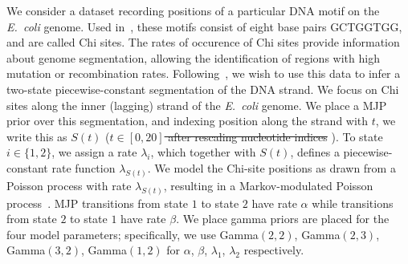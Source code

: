 
  We consider a dataset recording positions of a particular DNA motif 
  on the {\em E.\ coli} genome. Used in~\cite{FearnSher2006}, these 
  motifs consist of eight base pairs GCTGGTGG, and are called Chi sites.
  The rates of occurence of Chi sites provide information about genome 
  segmentation, allowing the identification of regions with high 
  mutation or recombination rates.
  Following~\cite{FearnSher2006}, we wish to use this data to infer a 
  two-state piecewise-constant segmentation of the DNA strand. 
  We focus on Chi sites along the inner (lagging) strand of the 
  {\em E.\ coli} genome.  We place a 
  MJP prior over this segmentation, and indexing position along the 
  strand with $t$, we write this as $S(t)$ (\sout{$t \in [0,20]$ after rescaling 
  nucleotide indices}  ). To state $i \in 
  \{1,2\}$, we assign a rate $\lambda_i$, which together with $S(t)$, 
  defines a piecewise-constant rate function $\lambda_{S(t)}$. We model 
  the Chi-site positions as drawn from a Poisson process with rate 
  $\lambda_{S(t)}$, resulting in a {Markov-modulated Poisson 
  process}~\citep{scottmmpp03}. 
  MJP transitions from state $1$ to state $2$ have rate $\alpha$ while 
  transitions from state $2$ to state $1$ have rate $\beta$. We place 
  gamma priors are placed for the four model parameters; specifically, 
  we use Gamma$(2,2)$, Gamma$(2,3)$, Gamma$(3,2)$, Gamma$(1,2)$ for 
  $\alpha$, $\beta$, $\lambda_1$, $\lambda_2$ respectively.

